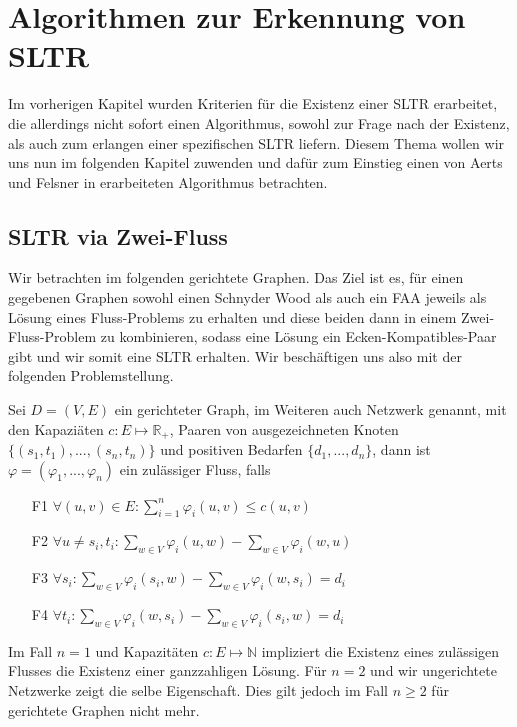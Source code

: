 \chapter{Algorithmen zur Erkennung von SLTR}

Im vorherigen Kapitel wurden Kriterien für die Existenz einer SLTR erarbeitet, die allerdings nicht sofort einen Algorithmus, sowohl zur Frage nach der Existenz, als auch zum erlangen einer spezifischen SLTR liefern. Diesem Thema wollen wir uns nun im folgenden Kapitel zuwenden und dafür zum Einstieg einen von Aerts und Felsner in \cite{af13} erarbeiteten Algorithmus betrachten.

\section{SLTR via Zwei-Fluss}

Wir betrachten im folgenden gerichtete Graphen. Das Ziel ist es, für einen gegebenen Graphen sowohl einen Schnyder Wood als auch ein FAA jeweils als Lösung eines Fluss-Problems zu erhalten und diese beiden dann in einem Zwei-Fluss-Problem zu kombinieren, sodass eine Lösung ein Ecken-Kompatibles-Paar gibt und wir somit eine SLTR erhalten. Wir beschäftigen uns also mit der folgenden Problemstellung.

\begin{definition}
Sei $D=(V,E)$ ein gerichteter Graph, im Weiteren auch Netzwerk genannt, mit den Kapaziäten $c:E\mapsto\mathbb{R}_{+}$, Paaren von ausgezeichneten Knoten $\{(s_1,t_1), ... ,(s_n,t_n)\}$ und positiven Bedarfen $\{d_1, ... ,d_n\}$, dann ist $\varphi=(\varphi_1, ... ,\varphi_n)$ ein zulässiger Fluss, falls
\begin{itemize}
\item[F1] $\forall (u,v) \in E : \sum_{i=1}^{n}{\varphi_i(u,v)} \leq c(u,v) $
\item[F2] $ \forall u \neq s_i,t_i : \sum_{w \in V} \varphi_i(u,w) - \sum_{w \in V} \varphi_i(w,u) $
\item[F3] $ \forall s_i : \sum_{w \in V} \varphi_i(s_i,w) - \sum_{w \in V} \varphi_i(w,s_i) = d_i $
\item[F4] $ \forall t_i : \sum_{w \in V} \varphi_i(w,s_i) - \sum_{w \in V} \varphi_i(s_i,w) = d_i $
\end{itemize}
\end{definition}

Im Fall $n=1$ und Kapazitäten $c:E\mapsto\mathbb{N}$ impliziert die Existenz eines zulässigen Flusses die Existenz einer ganzzahligen Lösung. Für $n=2$ und wir ungerichtete Netzwerke zeigt \cite{hu} die selbe Eigenschaft. Dies gilt jedoch im Fall $n \geq 2$ für gerichtete Graphen nicht mehr.

